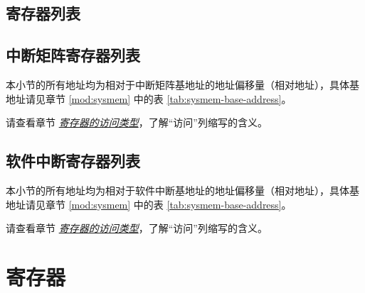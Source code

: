 \documentclass[main\_\_CN.tex]{subfiles}
\begin{document}



\newpage
\hypertarget{intmtrx-reg-summ}{}
\begin{landscape}
\section{寄存器列表}

\subsection{中断矩阵寄存器列表}
\label{sec:intmtrx-reg-summ}

本小节的所有地址均为相对于中断矩阵基地址的地址偏移量（相对地址），具体基地址请见章节 \ref{mod:sysmem} \textit{} 中的表 \ref{tab:sysmem-base-address}。

请查看章节 \hyperref[glossary-access-types]{\textit{寄存器的访问类型}}，了解“访问”列缩写的含义。



\subsection{软件中断寄存器列表}
\label{sec:intpri-reg-summ}

本小节的所有地址均为相对于软件中断基地址的地址偏移量（相对地址），具体基地址请见章节 \ref{mod:sysmem} \textit{} 中的表 \ref{tab:sysmem-base-address}。

请查看章节 \hyperref[glossary-access-types]{\textit{寄存器的访问类型}}，了解“访问”列缩写的含义。



\end{landscape}



\newpage
\section{寄存器}
\end{document}
